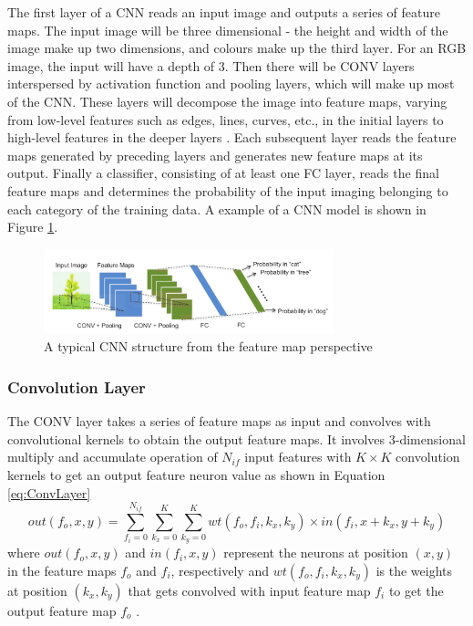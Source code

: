 \documentclass[12pt]{article}
\begin{document}
The first layer of a CNN reads an input image and outputs a series of feature maps. The input image will be three dimensional - the height and width of the image make up two dimensions, and colours make up the third layer. For an RGB image, the input will have a depth of 3. Then there will be CONV layers interspersed by activation function and pooling layers, which will make up most of the CNN. These layers will decompose the image into feature maps, varying from low-level features such as edges, lines, curves, etc., in the initial layers to high-level features in the deeper layers \cite{SudaFpgaAccelerator}. Each subsequent layer reads the feature maps generated by preceding layers and generates new feature maps at its output. Finally a classifier, consisting of at least one FC layer, reads the final feature maps and determines the probability of the input imaging belonging to each category of the training data. A example of a CNN model is shown in Figure \ref{fig:typicalCNN}.
\begin{figure}

\centering
\includegraphics[width=0.75\textwidth]{../figures/typicalCnn}

  \caption{A typical CNN structure from the feature map perspective \cite{embeddedFpgaCnn} \label{fig:typicalCNN}}

\end{figure}

\subsubsection{Convolution Layer}
\label{sec:Background-CNN-Conv}
\vspace{-12pt}

The CONV layer takes a series of feature maps as input and convolves with convolutional kernels to obtain the output feature maps. It involves 3-dimensional multiply and accumulate operation of $N_{if}$ input features with $K\times K$ convolution kernels to get an output feature neuron value as shown in Equation \ref{eq:ConvLayer}
\begin{equation}
out(f_o,x,y)=\sum^{N_{if}}_{f_i=0} \sum^{K}_{k_x=0} \sum^{K}_{k_y=0} wt(f_o,f_i,k_x,k_y)\times in(f_i,x+k_x,y+k_y)
\label{eq:ConvLayer}
\end{equation}
where $out(f_o,x,y)$ and $in(f_i,x,y)$ represent the neurons at position $(x,y)$ in the feature maps $f_o$ and $f_i$, respectively and $wt(f_o,f_i,k_x,k_y)$ is the weights at position $(k_x,k_y)$ that gets convolved with input feature map $f_i$ to get the output feature map $f_o$ \cite{SudaFpgaAccelerator}.
\end{document}
